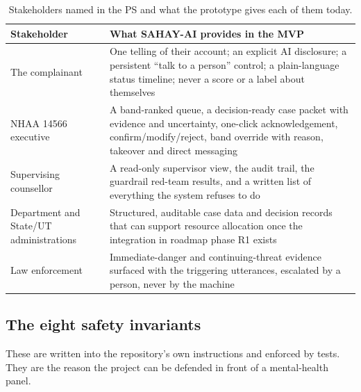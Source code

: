 \documentclass[11pt,a4paper]{article}
\begin{document}
\begin{table}[!htbp]
\centering\small
\caption{Stakeholders named in the PS and what the prototype gives each of them today.}
\label{tab:stake}
\begin{tabularx}{\linewidth}{@{}>{\raggedright\arraybackslash}p{4.6cm}X@{}}
\toprule
Stakeholder & What SAHAY-AI provides in the MVP \\
\midrule
The complainant & One telling of their account; an explicit AI disclosure; a persistent
``talk to a person'' control; a plain-language status timeline; never a score or a label about
themselves \\
NHAA 14566 executive & A band-ranked queue, a decision-ready case packet with evidence and
uncertainty, one-click acknowledgement, confirm/modify/reject, band override with reason, takeover
and direct messaging \\
Supervising counsellor & A read-only supervisor view, the audit trail, the guardrail red-team
results, and a written list of everything the system refuses to do \\
Department and State/UT administrations & Structured, auditable case data and decision records that
can support resource allocation once the integration in roadmap phase R1 exists \\
Law enforcement & Immediate-danger and continuing-threat evidence surfaced with the triggering
utterances, escalated by a person, never by the machine \\
\bottomrule
\end{tabularx}
\end{table}

\subsection{The eight safety invariants}
\label{sec:invariants}
These are written into the repository's own instructions and enforced by tests. They are the reason
the project can be defended in front of a mental-health panel.
\end{document}
